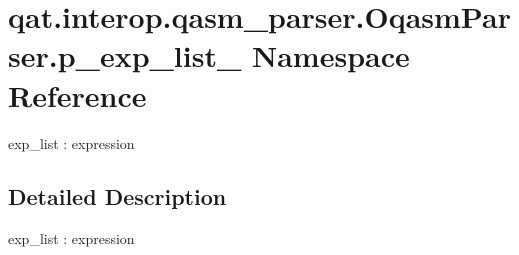 \hypertarget{namespaceqat_1_1interop_1_1qasm__parser_1_1OqasmParser_1_1p__exp__list__0}{\section{qat.\-interop.\-qasm\-\_\-parser.\-Oqasm\-Parser.\-p\-\_\-exp\-\_\-list\-\_ Namespace Reference}
\label{namespaceqat_1_1interop_1_1qasm__parser_1_1OqasmParser_1_1p__exp__list__0}
}


exp\-\_\-list \-: expression  




\subsection{Detailed Description}
exp\-\_\-list \-: expression 